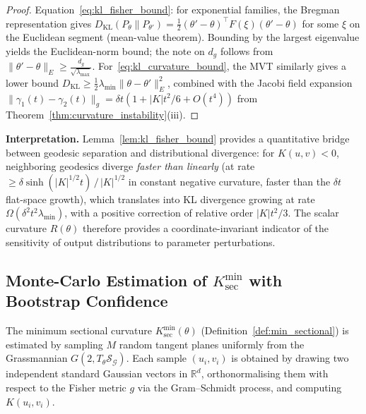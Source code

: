 \documentclass[a4paper,fleqn]{cas-dc}
\newcommand{\R}{\mathbb{R}}
\newcommand{\calS}{\mathcal{S}}
\newcommand{\calG}{\mathcal{G}}
\begin{document}
\begin{proof}
  Equation~\eqref{eq:kl_fisher_bound}: for exponential families, the
  Bregman representation gives
  $D_{\mathrm{KL}}(P_\theta\|P_{\theta'}) =
  \frac{1}{2}(\theta'-\theta)^\top F(\xi)(\theta'-\theta)$
  for some $\xi$ on the Euclidean segment (mean-value theorem).
  Bounding by the largest eigenvalue yields the Euclidean-norm bound;
  the note on $d_g$ follows from $\|\theta'-\theta\|_E \geq \frac{d_g}{\sqrt{\lambda_{\max}}}$.
  For~\eqref{eq:kl_curvature_bound}, the MVT similarly gives a lower
  bound $D_\mathrm{KL} \geq \frac{1}{2}\lambda_{\min}\|\theta-\theta'\|_E^2$,
  combined with the Jacobi field expansion
  $\|\gamma_1(t)-\gamma_2(t)\|_g = \delta t(1+|K|t^2/6+O(t^4))$
  from Theorem~\ref{thm:curvature_instability}(iii).
\end{proof}

\textbf{Interpretation.}
Lemma~\ref{lem:kl_fisher_bound} provides a quantitative bridge between
geodesic separation and distributional divergence: for $K(u,v)<0$,
neighboring geodesics diverge \emph{faster than linearly} (at rate
$\geq \delta\sinh(|K|^{1/2}t)\,/\,|K|^{1/2}$ in constant negative curvature,
faster than the $\delta t$ flat-space growth), which translates into
KL divergence growing at rate $\Omega(\delta^2 t^2 \lambda_{\min})$,
with a positive correction of relative order $|K|t^2/3$.
The scalar curvature $R(\theta)$ therefore provides a
coordinate-invariant indicator of the sensitivity of output
distributions to parameter perturbations.

\subsection{Monte-Carlo Estimation of \texorpdfstring{$K_{\sec}^{\min}$}{Minimum Sectional Curvature} with Bootstrap Confidence}
\label{subsec:kmin_bootstrap}

The minimum sectional curvature $K_{\sec}^{\min}(\theta)$
(Definition~\ref{def:min_sectional}) is estimated by sampling $M$ random
tangent planes uniformly from the Grassmannian $G(2, T_\theta\calS_{\calG})$.
Each sample $(u_i, v_i)$ is obtained by drawing two independent standard
Gaussian vectors in $\R^d$, orthonormalising them with respect to the Fisher
metric $g$ via the Gram--Schmidt process, and computing $K(u_i, v_i)$.
\end{document}
